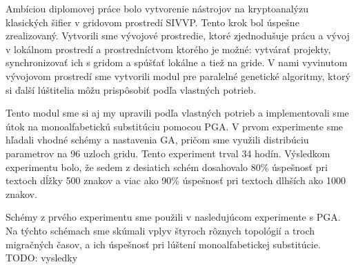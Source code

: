 
Ambíciou diplomovej práce bolo vytvorenie nástrojov na kryptoanalýzu klasických šifier v gridovom prostredí SIVVP.
Tento krok bol úspešne zrealizovaný. Vytvorili sme vývojové prostredie, ktoré zjednodušuje prácu a vývoj v lokálnom prostredí
a prostredníctvom ktorého je možné: vytvárať projekty,  synchronizovať ich s gridom a spúšťať lokálne a tiež na gride.
V nami vyvinutom vývojovom prostredí sme vytvorili modul pre paralelné genetické algoritmy,
ktorý si ďalší lúštitelia môžu prispôsobiť podľa vlastných potrieb.

Tento modul sme si aj my upravili podľa vlastných potrieb a implementovali sme útok na monoalfabetickú substitúciu pomocou PGA.
V prvom experimente sme hľadali vhodné schémy a nastavenia GA, pričom sme využili distribúciu parametrov na 96 uzloch gridu.
Tento experiment trval 34 hodín. Výsledkom experimentu bolo, že sedem z desiatich schém dosahovalo 80\% úspešnosť pri textoch
dĺžky 500 znakov a viac ako 90\% úspešnosť pri textoch dlhších ako 1000 znakov.

Schémy z prvého experimentu sme použili v nasledujúcom experimente s PGA.
Na týchto schémach sme skúmali vplyv štyroch rôznych topológií a troch migračných časov, a ich úspešnosť pri lúštení
monoalfabetickej substitúcie.
TODO: vysledky


